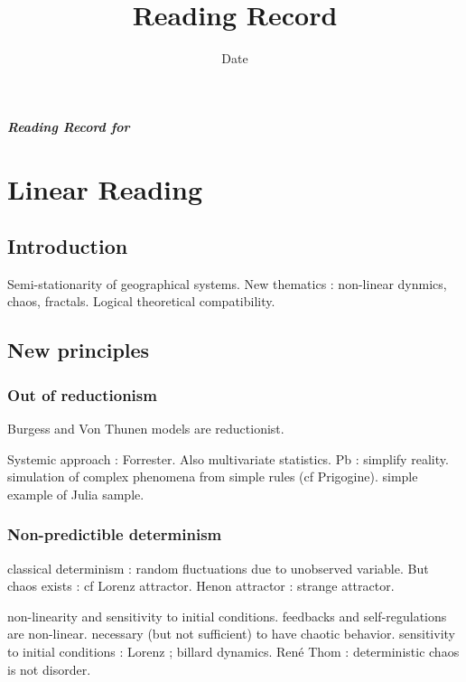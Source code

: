 


\title{Reading Record\bigskip\\
\cite{dauphine1995chaos}
}
\author{}
\date{Date}


\maketitle

\textbf{\textit{Reading Record for \cite{dauphine1995chaos}}}



\section{Linear Reading}

\subsection*{Introduction}

Semi-stationarity of geographical systems. New thematics : non-linear dynmics, chaos, fractals. Logical theoretical compatibility.

\subsection{New principles}

\subsubsection{Out of reductionism}

Burgess and Von Thunen models are reductionist.

Systemic approach : Forrester. Also multivariate statistics. Pb : simplify reality. simulation of complex phenomena from simple rules (cf Prigogine). simple example of Julia sample.

\subsubsection{Non-predictible determinism}

classical determinism : random fluctuations due to unobserved variable. But chaos exists : cf Lorenz attractor. Henon attractor : strange attractor.

non-linearity and sensitivity to initial conditions. feedbacks and self-regulations are non-linear. necessary (but not sufficient) to have chaotic behavior. sensitivity to initial conditions : Lorenz ; billard dynamics. René Thom : deterministic chaos is not disorder.

